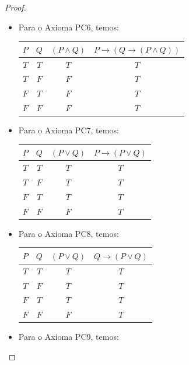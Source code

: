 \begin{proof}
\begin{itemize}
\begin{center}
\begin{tabular}{c|c|c|c}
                $F$ & $F$ & $F$ & $T$
            \end{tabular}
        \end{center}
        \item Para o Axioma PC6, temos:
        \begin{center}
            \begin{tabular}{c|c|c|c}
                $P$ & $Q$ & $(P \land Q)$ & $P \rightarrow (Q \rightarrow (P \land Q))$ \\
                \hline
                $T$ & $T$ & $T$ & $T$ \\
                $T$ & $F$ & $F$ & $T$ \\
                $F$ & $T$ & $F$ & $T$ \\
                $F$ & $F$ & $F$ & $T$
            \end{tabular}
        \end{center}
        \item Para o Axioma PC7, temos:
        \begin{center}
            \begin{tabular}{c|c|c|c}
                $P$ & $Q$ & $(P \lor Q)$ & $P \rightarrow (P \lor Q)$ \\
                \hline
                $T$ & $T$ & $T$ & $T$ \\
                $T$ & $F$ & $T$ & $T$ \\
                $F$ & $T$ & $T$ & $T$ \\
                $F$ & $F$ & $F$ & $T$
            \end{tabular}
        \end{center}
        \item Para o Axioma PC8, temos:
        \begin{center}
            \begin{tabular}{c|c|c|c}
                $P$ & $Q$ & $(P \lor Q)$ & $Q \rightarrow (P \lor Q)$ \\
                \hline
                $T$ & $T$ & $T$ & $T$ \\
                $T$ & $F$ & $T$ & $T$ \\
                $F$ & $T$ & $T$ & $T$ \\
                $F$ & $F$ & $F$ & $T$
            \end{tabular}
        \end{center}
        \item Para o Axioma PC9, temos:
        \begin{center}

\end{center}
\end{itemize}
\end{proof}
